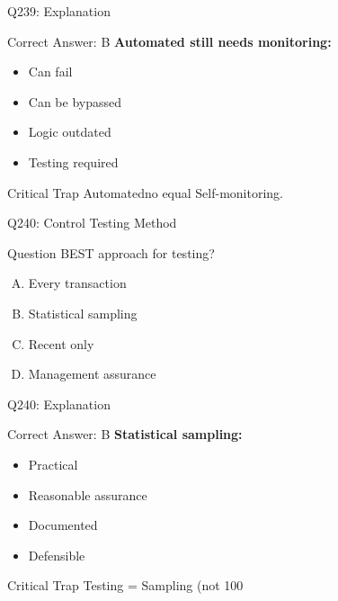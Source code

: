 \documentclass{beamer}
\begin{document}
	\begin{frame}{Q239: Explanation}
		\begin{block}{Correct Answer: B}
			\textbf{Automated still needs monitoring:}
			\begin{itemize}
				\item Can fail
				\item Can be bypassed
				\item Logic outdated
				\item Testing required
			\end{itemize}
		\end{block}
		\begin{alertblock}{Critical Trap}
			Automatedno equal Self-monitoring.
		\end{alertblock}
	\end{frame}
	
	\begin{frame}{Q240: Control Testing Method}
		\begin{block}{Question}
			BEST approach for testing?
		\end{block}
		\begin{enumerate}[(A)]
			\item Every transaction
			\item Statistical sampling
			\item Recent only
			\item Management assurance
		\end{enumerate}
	\end{frame}
	
	\begin{frame}{Q240: Explanation}
		\begin{block}{Correct Answer: B}
			\textbf{Statistical sampling:}
			\begin{itemize}
				\item Practical
				\item Reasonable assurance
				\item Documented
				\item Defensible
			\end{itemize}
		\end{block}
		\begin{alertblock}{Critical Trap}
			Testing = Sampling (not 100%
		\end{alertblock}
	\end{frame}
	
	
\end{document}

